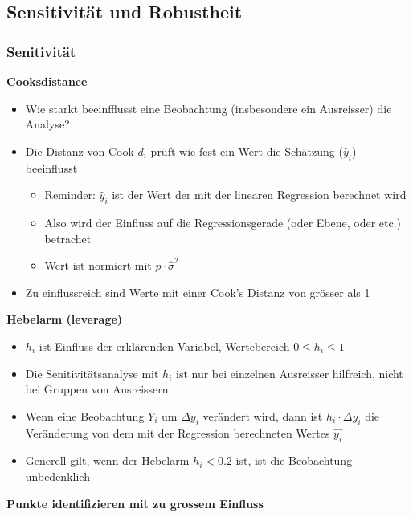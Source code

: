 \subsection{Sensitivität und Robustheit}

\subsubsection{Senitivität}
\textbf{Cooksdistance}
\begin{itemize}
	\item Wie starkt beeinfflusst eine Beobachtung (insbesondere ein Ausreisser) die Analyse?
	\item Die Distanz von Cook $d_i$ prüft wie fest ein Wert die Schätzung ($\hat{y}_i$) beeinflusst
	\begin{itemize}
		\item Reminder: $\hat{y}_i$ ist der Wert der mit der linearen Regression berechnet wird
		\item Also wird der Einfluss auf die Regressionsgerade (oder Ebene, oder etc.) betrachet
		\item Wert ist normiert mit $p\cdot\hat{\sigma}^2$
	\end{itemize}
	\item Zu einflussreich sind Werte mit einer Cook's Distanz von grösser als 1
\end{itemize}
\textbf{Hebelarm (leverage)}
\begin{itemize}
	\item $h_i$ ist Einfluss der erklärenden Variabel, Wertebereich $0\leq h_i \leq 1$
	\item Die Senitivitätsanalyse mit $h_i$ ist nur bei einzelnen Ausreisser hilfreich, nicht bei Gruppen von Ausreissern
	\item Wenn eine Beobachtung $Y_i$ um $\Delta y_i$ verändert wird, dann ist $h_i\cdot\Delta y_i$ die Veränderung von dem mit der  Regression berechneten Wertes $\hat{y_i}$
	\item Generell gilt, wenn der Hebelarm $h_i<0.2$ ist, ist die Beobachtung unbedenklich
\end{itemize}
\textbf{Punkte identifizieren mit zu grossem Einfluss}
